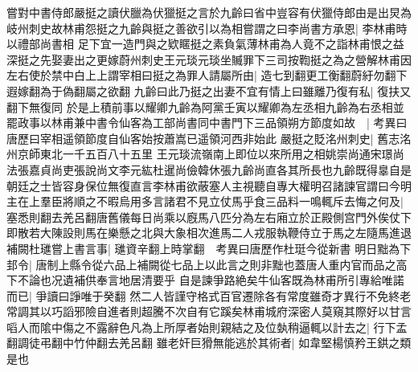 嘗對中書侍郎嚴挺之讀伏臘為伏獵挺之言於九齡曰省中豈容有伏獵侍郎由是出炅為岐州刺史故林甫怨挺之九齡與挺之善欲引以為相嘗謂之曰李尚書方承恩|{
	李林甫時以禮部尚書相}
足下宜一造門與之欵䁥挺之素負氣薄林甫為人竟不之詣林甫恨之益深挺之先娶妻出之更嫁蔚州刺史王元琰元琰坐贓罪下三司按鞫挺之為之營解林甫因左右使於禁中白上上謂宰相曰挺之為罪人請屬所由|{
	造七到翻更工衡翻蔚紆勿翻下遐嫁翻為于偽翻屬之欲翻}
九齡曰此乃挺之出妻不宜有情上曰雖離乃復有私|{
	復扶又翻下無復同}
於是上積前事以耀卿九齡為阿黨壬寅以耀卿為左丞相九齡為右丞相並罷政事以林甫兼中書令仙客為工部尚書同中書門下三品領朔方節度如故　|{
	考異曰唐歷曰宰相遥領節度自仙客始按蕭嵩已遥領河西非始此}
嚴挺之貶洺州刺史|{
	舊志洺州京師東北一千五百八十五里}
王元琰流嶺南上即位以來所用之相姚崇尚通宋璟尚法張嘉貞尚吏張說尚文李元紘杜暹尚儉韓休張九齡尚直各其所長也九齡既得辠自是朝廷之士皆容身保位無復直言李林甫欲蔽塞人主視聽自專大權明召諸諫官謂曰今明主在上羣臣將順之不暇烏用多言諸君不見立仗馬乎食三品料一鳴輒斥去悔之何及|{
	塞悉則翻去羌呂翻唐舊儀每日尚乘以廐馬八匹分為左右廂立於正殿側宫門外俟仗下即散若大陳設則馬在樂懸之北與大象相次進馬二人戎服執鞭侍立于馬之左隨馬進退}
補闕杜璡嘗上書言事|{
	璡資辛翻上時掌翻　考異曰唐歷作杜珽今從新書}
明日黜為下邽令|{
	唐制上縣令從六品上補闕從七品上以此言之則非黜也蓋唐人重内官而品之高下不論也况遺補供奉言地居清要乎}
自是諫爭路絶矣牛仙客既為林甫所引專給唯諾而已|{
	爭讀曰諍唯于癸翻}
然二人皆謹守格式百官遷除各有常度雖奇才異行不免終老常調其以巧謟邪險自進者則超騰不次自有它蹊矣林甫城府深密人莫窺其際好以甘言㗖人而隂中傷之不露辭色凡為上所厚者始則親結之及位埶稍逼輒以計去之|{
	行下孟翻調徒弔翻中竹仲翻去羌呂翻}
雖老奸巨猾無能逃於其術者|{
	如韋堅楊慎矜王鉷之類是也}


